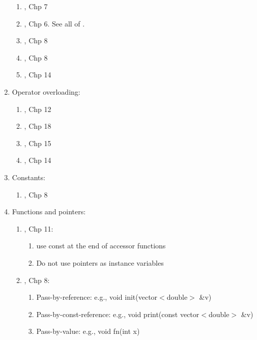 \begin{enumerate}
	\begin{enumerate} \itemsep -2pt
	\item \cite{Eckel2000}, Chp 7
	\item \cite{Gaddis2010}, Chp 6. See all of \cite{Gaddis2010,Gaddis2011,Gaddis2012}.
	\item \cite{Stroustrup2014}, Chp 8
	\item \cite{Stroustrup2009}, Chp 8
	\item \cite{Schildt2003}, Chp 14
	\end{enumerate}
\item Operator overloading: \vspace{-0.3cm}
	\begin{enumerate} \itemsep -2pt
	\item \cite{Eckel2000}, Chp 12
	\item \cite{Oualline2003}, Chp 18
	\item \cite{Schildt2003}, Chp 15
	\item \cite{Lippman2013}, Chp 14
	\end{enumerate}
\item Constants: \vspace{-0.3cm}
	\begin{enumerate} \itemsep -2pt
	\item \cite{Eckel2000}, Chp 8
	\end{enumerate}
\item Functions and pointers: \vspace{-0.3cm}
	\begin{enumerate} \itemsep -2pt
	\item \cite{Eckel2000}, Chp 11: \vspace{-0.2cm}
		\begin{enumerate} \itemsep -2pt
		\item use const at the end of accessor functions
		\item Do not use pointers as instance variables
		\end{enumerate}
	\item \cite{Stroustrup2014}, Chp 8: \vspace{-0.2cm}
		\begin{enumerate} \itemsep -2pt
		\item Pass-by-reference: e.g., void init(vector$<$double$>$ \&v)
		\item Pass-by-const-reference: e.g., void print(const vector$<$double$>$ \&v)
		\item Pass-by-value: e.g., void fn(int x)
		\end{enumerate}

\end{enumerate}
\end{enumerate}
